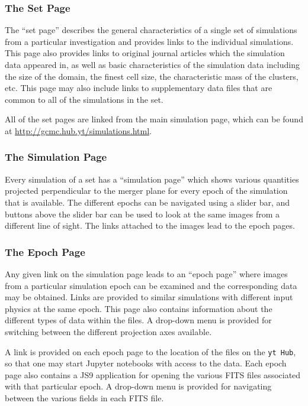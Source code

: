 \documentclass{emulateapj}
\newcommand{\code}[1]{\texttt{#1}}
\begin{document}
\subsubsection{The Set Page}\label{sec:set_page}

The ``set page'' describes the general characteristics of a single set of simulations from a particular investigation and provides links to the individual simulations. This page also provides links to original journal articles which the simulation data appeared in, as well as basic characteristics of the simulation data including the size of the domain, the finest cell size, the characteristic mass of the clusters, etc. This page may also include links to supplementary data files that are common to all of the simulations in the set.

All of the set pages are linked from the main simulation page, which can be found at \url{http://gcmc.hub.yt/simulations.html}.

\subsubsection{The Simulation Page}\label{sec:sim_page}

Every simulation of a set has a ``simulation page'' which shows various quantities projected perpendicular to the merger plane for every epoch of the simulation that is available. The different epochs can be navigated using a slider bar, and buttons above the slider bar can be used to look at the same images from a different line of sight. The links attached to the images lead to the epoch pages.

\subsubsection{The Epoch Page}\label{sec:epoch_page}

Any given link on the simulation page leads to an ``epoch page'' where images from a particular simulation epoch can be examined and the corresponding data may be obtained. Links are provided to similar simulations with different input physics at the same epoch. This page also contains information about the different types of data within the files. A drop-down menu is provided for switching between the different projection axes available.

A link is provided on each epoch page to the location of the files on the \code{yt Hub}, so that one may start Jupyter notebooks with access to the data. Each epoch page also contains a JS9 application for opening the various FITS files associated with that particular epoch. A drop-down menu is provided for navigating between the various fields in each FITS file.
\end{document}
